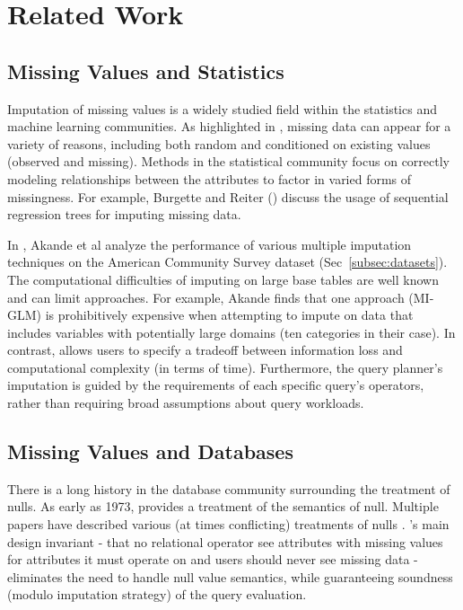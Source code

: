 \section{Related Work}

\subsection{Missing Values and Statistics}

Imputation of missing values is a widely studied field within the statistics and machine
learning communities. As highlighted in \cite{gelman2006data}, missing data
can appear for a variety of reasons, including both random and conditioned on
existing values (observed and missing). Methods in the statistical community
focus on correctly modeling relationships between the attributes to factor in
varied forms of missingness. For example, Burgette and Reiter
(\cite{burgette2010multiple}) discuss the usage of sequential regression trees
for imputing missing data.

In \cite{akande2015empirical}, Akande et al analyze the performance of various
multiple imputation techniques on the American Community Survey dataset
(Sec~\ref{subsec:datasets}). The computational difficulties of imputing on large base
tables are well known and can limit approaches. For example, Akande finds that
one approach (MI-GLM) is prohibitively expensive when attempting to impute on data that
includes variables with potentially large domains (ten categories in their case).
In contrast, \ProjectName{} allows users to specify a tradeoff between
information loss and computational complexity (in terms of time). Furthermore,
the query planner's imputation is guided by the requirements of each specific
query's operators, rather than requiring broad assumptions about query
workloads.  

\subsection{Missing Values and Databases}
There is a long history in the database community surrounding the
treatment of nulls. As early as 1973, \cite{codd1973understanding}
provides a treatment of the semantics of null. Multiple
papers have described various (at times conflicting) treatments
of nulls \cite{grant1977null}. \ProjectName's main design invariant - that no relational operator
see attributes with missing values for attributes it must operate on and users should never see
missing data - eliminates
the need to handle null value semantics, while guaranteeing soundness (modulo
imputation strategy) of the query evaluation.


